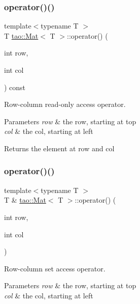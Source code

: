 \subsubsection{\texorpdfstring{operator()()}{operator()()}\hspace{0.1cm}{\footnotesize\ttfamily [1/2]}}
{\footnotesize\ttfamily template$<$typename T $>$ \\
T \mbox{\hyperlink{classtao_1_1_mat}{tao\+::\+Mat}}$<$ T $>$\+::operator() (\begin{DoxyParamCaption}\item[{int}]{row,  }\item[{int}]{col }\end{DoxyParamCaption}) const}



Row-\/column read-\/only access operator. 


\begin{DoxyParams}{Parameters}
{\em row} & the row, starting at top \\
\hline
{\em col} & the col, starting at left \\
\hline
\end{DoxyParams}
\begin{DoxyReturn}{Returns}
the element at row and col 
\end{DoxyReturn}
\mbox{\label{classtao_1_1_mat_ac0372cf9e7da0ab734e7c58888e5d85a}} 
\subsubsection{\texorpdfstring{operator()()}{operator()()}\hspace{0.1cm}{\footnotesize\ttfamily [2/2]}}
{\footnotesize\ttfamily template$<$typename T $>$ \\
T \& \mbox{\hyperlink{classtao_1_1_mat}{tao\+::\+Mat}}$<$ T $>$\+::operator() (\begin{DoxyParamCaption}\item[{int}]{row,  }\item[{int}]{col }\end{DoxyParamCaption})}



Row-\/column set access operator. 


\begin{DoxyParams}{Parameters}
{\em row} & the row, starting at top \\
\hline
{\em col} & the col, starting at left \\
\hline
\end{DoxyParams}
\mbox{\label{classtao_1_1_mat_a84cc1217fbedd04adbcc6068d7fd493a}} 
